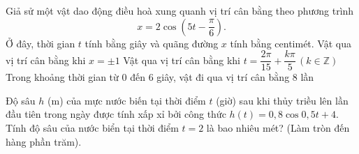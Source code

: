\begin{ex}%
	Giả sử một vật dao động điều hoà xung quanh vị trí cân bằng theo phương trình
	$$
	x=2 \cos \left(5 t-\dfrac{\pi}{6}\right).
	$$
	Ở đây, thời gian $t$ tính bằng giây và quãng đường $x$ tính bằng centimét. 
	{Vật qua vị trí cân bằng khi $x=\pm 1$}
	{\True Vật qua vị trí cân bằng khi $t=\dfrac{2\pi}{15}+\dfrac{k\pi}{5} \,\left(k\in \mathbb{Z}\right)$}
	{Trong khoảng thời gian từ $ 0 $ đến $ 6 $ giây, vật đi qua vị trí cân bằng $8$ lần}
\end{ex}

\begin{bt}%
	Độ sâu $h$ (m) của mực nước biến tại thời điểm $t$ (giờ) sau khi thủy triều lên lần đầu tiên trong ngày được tính xấp xỉ bởi công thức $h(t)=0{,}8\cos 0{,}5t+4$. Tính độ sâu của nước biển tại thời điểm $t=2$ là bao nhiêu mét? (Làm tròn đến hàng phần trăm).
\end{bt}

